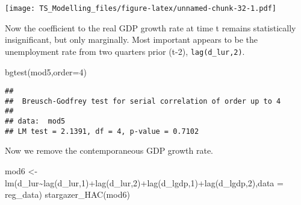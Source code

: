 \documentclass[
]{article}
\newenvironment{Shaded}{\begin{snugshade}}{\end{snugshade}}
\newcommand{\AttributeTok}[1]{\textcolor[rgb]{0.77,0.63,0.00}{#1}}
\newcommand{\DecValTok}[1]{\textcolor[rgb]{0.00,0.00,0.81}{#1}}
\newcommand{\FunctionTok}[1]{\textcolor[rgb]{0.00,0.00,0.00}{#1}}
\newcommand{\NormalTok}[1]{#1}
\newcommand{\OtherTok}[1]{\textcolor[rgb]{0.56,0.35,0.01}{#1}}
\newcommand{\SpecialCharTok}[1]{\textcolor[rgb]{0.00,0.00,0.00}{#1}}
\newcommand{\StringTok}[1]{\textcolor[rgb]{0.31,0.60,0.02}{#1}}
\begin{document}
\begin{Shaded}
\end{Shaded}

\texttt{[image: TS\_Modelling\_files/figure-latex/unnamed-chunk-32-1.pdf]}

Now the coefficient to the real GDP growth rate at time t remains
statistically insignificant, but only marginally. Most important appears
to be the unemployment rate from two quarters prior (t-2),
\texttt{lag(d\_lur,2)}.

\begin{Shaded}
\begin{Highlighting}[]
\FunctionTok{bgtest}\NormalTok{(mod5,}\AttributeTok{order=}\DecValTok{4}\NormalTok{)}
\end{Highlighting}
\end{Shaded}

\begin{verbatim}
## 
##  Breusch-Godfrey test for serial correlation of order up to 4
## 
## data:  mod5
## LM test = 2.1391, df = 4, p-value = 0.7102
\end{verbatim}

Now we remove the contemporaneous GDP growth rate.

\begin{Shaded}
\begin{Highlighting}[]
\NormalTok{mod6 }\OtherTok{\textless{}{-}} \FunctionTok{lm}\NormalTok{(d\_lur}\SpecialCharTok{\textasciitilde{}}\FunctionTok{lag}\NormalTok{(d\_lur,}\DecValTok{1}\NormalTok{)}\SpecialCharTok{+}\FunctionTok{lag}\NormalTok{(d\_lur,}\DecValTok{2}\NormalTok{)}\SpecialCharTok{+}\FunctionTok{lag}\NormalTok{(d\_lgdp,}\DecValTok{1}\NormalTok{)}\SpecialCharTok{+}\FunctionTok{lag}\NormalTok{(d\_lgdp,}\DecValTok{2}\NormalTok{),}\AttributeTok{data =}\NormalTok{ reg\_data)}
\FunctionTok{stargazer\_HAC}\NormalTok{(mod6)}
\end{Highlighting}
\end{Shaded}
\end{document}
